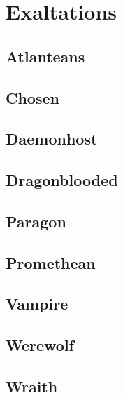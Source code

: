 \documentclass[10pt,twoside,openany]{book}
\begin{document}
\chapter{Exaltations}
\begin{multicols}{2}

	\section{Atlanteans}

	\section{Chosen}

	\section{Daemonhost}

	\section{Dragonblooded}

	\section{Paragon}

	\section{Promethean}

	\section{Vampire}

	\section{Werewolf}

	\section{Wraith}

\end{multicols}
\end{document}
